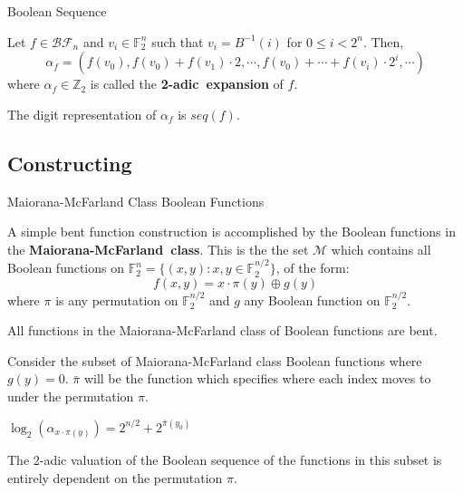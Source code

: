 \documentclass{beamer}
\def\zzz{\mathbb{Z}}
\def\gftwo{\mathbb{F}_2}
\def\BF{\mathcal{BF}}
\begin{document}
\begin{frame}{Boolean Sequence}
  \begin{definition}\label{2-adic-ex}
    Let $f\in\BF_n$ and $v_i\in\gftwo^n$ such that $v_i=B^{-1}(i)$ for
    $0\leq i<2^n$. Then,
    \begin{equation}
      \alpha_f=(f(v_0),f(v_0)+f(v_1)\cdot2,\cdots,\allowbreak
        f(v_0)+\cdots\allowbreak+f(v_i)\cdot2^i,\allowbreak\cdots)
    \end{equation}
    where $\alpha_f\in\zzz_2$ is called the {\bf 2-adic\ expansion} of $f$.
  \end{definition}
  
  \begin{lemma}
    The digit representation of $\alpha_f$ is $seq(f)$.
  \end{lemma}
\end{frame}

\subsection{Constructing}
\begin{frame}{Maiorana-McFarland Class Boolean Functions}
  \par A simple bent function construction is accomplished by the Boolean
  functions in the {\bf Maiorana-McFarland\ class}. This is the the set
  $\mathcal{M}$ which contains all Boolean functions on
  $\gftwo^n=\{(x,y):x,y\in\gftwo^{n/2}\}$, of the form:
    \[
    f(x,y)=x\cdot\pi(y)\oplus g(y)
    \]
  where $\pi$ is any permutation on $\gftwo^{n/2}$ and $g$ any Boolean
  function on $\gftwo^{n/2}$.\\
  
  \par All functions in the Maiorana-McFarland class of Boolean functions are
  bent.
\end{frame}
  
\begin{frame}
  \par Consider the subset of Maiorana-McFarland class Boolean functions where
  $g(y)=0$. $\bar{\pi}$ will be the function which specifies where each
  index moves to under the permutation $\pi$.
  
  \begin{theorem}
    $\log_2(\alpha_{x\cdot\pi(y)})=2^{n/2}+2^{\bar{\pi}(y_0)}$
  \end{theorem}

  \par The 2-adic valuation of the Boolean sequence of the functions in this
  subset is entirely dependent on the permutation $\pi$.
\end{frame}
\end{document}

